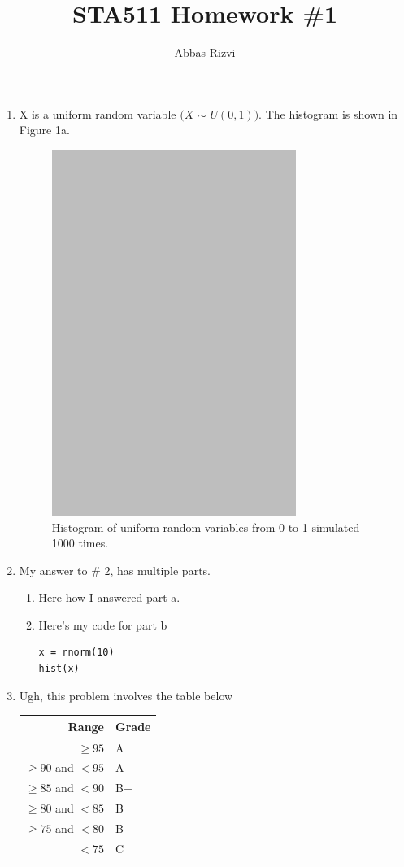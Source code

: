 \documentclass[letterpaper]{article}
\begin{document}
\title{STA511 Homework \#1}
\date{}
\author{Abbas Rizvi}
\maketitle

\begin{enumerate}

\item X is a uniform random variable $(X$ $\sim$ $U(0,1))$. The histogram is shown in Figure 1a.
\begin{figure}[h!]
\caption{Histogram of uniform random variables from 0 to 1 simulated 1000 times.}

\includegraphics{hw1-q2a-runiform-histogram.pdf}
\end{figure}

\item My answer to \# 2, has multiple parts.

\begin{enumerate}
\item Here how I answered part a.
\item Here's my code for part b
\begin{verbatim}
x = rnorm(10)
hist(x)
\end{verbatim}
\end{enumerate} 

\item Ugh, this problem involves the table below
\begin{center}
\begin{tabular}{rl}
Range & Grade \\
\hline
$\geq 95$ & A\\
$\geq 90$ and $<95$ & A-\\
$\geq 85$ and $<90$ & B+\\
$\geq 80$ and $<85$ & B\\
$\geq 75$ and $<80$ & B-\\
$<75$ & C\\
\end{tabular}
\end{center}

\end{enumerate}
\end{document}
